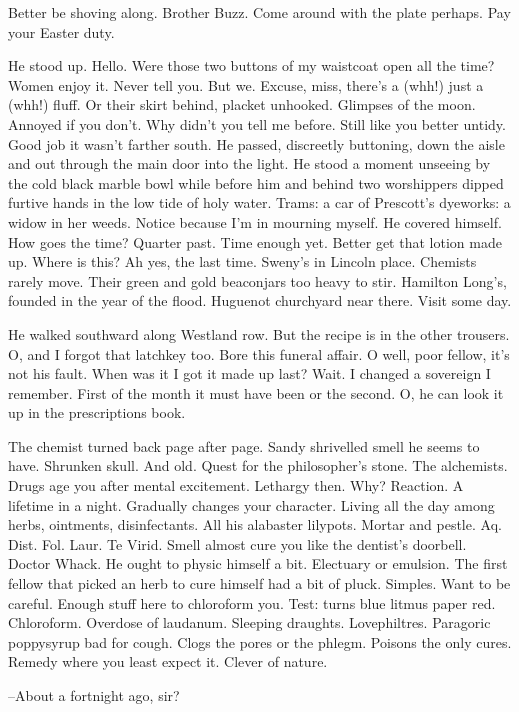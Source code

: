 Better be shoving along. Brother Buzz. Come around with the plate
perhaps. Pay your Easter duty.

He stood up. Hello. Were those two buttons of my waistcoat open all
the time? Women enjoy it. Never tell you. But we. Excuse, miss, there's a
(whh!) just a (whh!) fluff. Or their skirt behind, placket unhooked.
Glimpses of the moon. Annoyed if you don't. Why didn't you tell me
before. Still like you better untidy. Good job it wasn't farther south. He
passed, discreetly buttoning, down the aisle and out through the main door
into the light. He stood a moment unseeing by the cold black marble bowl
while before him and behind two worshippers dipped furtive hands in the
low tide of holy water. Trams: a car of Prescott's dyeworks: a widow in
her  weeds. Notice because I'm in mourning myself. He covered himself. How
goes the time? Quarter past. Time enough yet. Better get that lotion made
up. Where is this? Ah yes, the last time. Sweny's in Lincoln place.
Chemists rarely move. Their green and gold beaconjars too heavy to stir.
Hamilton Long's, founded in the year of the flood. Huguenot churchyard
near there. Visit some day.

He walked southward along Westland row. But the recipe is in the
other trousers. O, and I forgot that latchkey too. Bore this funeral
affair. O well, poor fellow, it's not his fault. When was it I got it made
up last? Wait. I changed a sovereign I remember. First of the month it
must have been or the second. O, he can look it up in the prescriptions
book.

The chemist turned back page after page. Sandy shrivelled smell he
seems to have. Shrunken skull. And old. Quest for the philosopher's stone.
The alchemists. Drugs age you after mental excitement. Lethargy then.
Why? Reaction. A lifetime in a night. Gradually changes your character.
Living all the day among herbs, ointments, disinfectants. All his
alabaster lilypots. Mortar and pestle. Aq. Dist. Fol. Laur. Te Virid.
Smell almost cure you like the dentist's doorbell. Doctor Whack. He ought
to physic himself a bit. Electuary or emulsion. The first fellow that
picked an herb to cure himself had a bit of pluck. Simples. Want to be
careful. Enough stuff here to chloroform you. Test: turns blue litmus
paper red. Chloroform. Overdose of laudanum. Sleeping draughts.
Lovephiltres. Paragoric poppysyrup bad for cough. Clogs the pores or the
phlegm. Poisons the only cures. Remedy where you least expect it. Clever
of nature.

--About a fortnight ago, sir?

